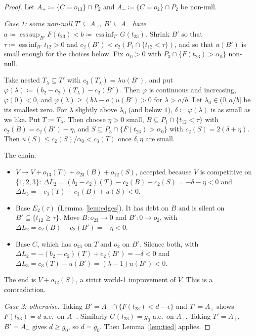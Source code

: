 \documentclass[11pt]{article}
\theoremstyle{definition}\newtheorem{definition}[theorem]{Definition}
\theoremstyle{remark}\newtheorem{remark}[theorem]{Remark}
\begin{document}
\begin{proof}
Let $A_+\coloneqq\{C=o_{13}\}\cap P_2$ and $A_-\coloneqq\{C=o_2\}\cap P_2$ be
non-null.

\emph{Case 1: some non-null $T'\subseteq A_+$, $B'\subseteq A_-$ have
$a\coloneqq\operatorname{ess\,sup}_{B'}F(t_{23})
<b\coloneqq\operatorname{ess\,inf}_{T'}G(t_{23})$.} Shrink $B'$ so that
$\tau\coloneqq\operatorname{ess\,inf}_{B'}t_{12}>0$ and
$c_2(B')<c_2(P_1\cap\{t_{12}<\tau\})$, and so that $u(B')$ is small enough
for the choices below. Fix $\alpha_0>0$ with $P_3\cap\{F(t_{23})>\alpha_0\}$
non-null.

Take nested $T_\lambda\subseteq T'$ with $c_3(T_\lambda)=\lambda u(B')$, and
put $\varphi(\lambda)\coloneqq(b_2-c_2)(T_\lambda)-c_2(B')$. Then $\varphi$ is
continuous and increasing, $\varphi(0)<0$, and
$\varphi(\lambda)\ge(b\lambda-a)u(B')>0$ for $\lambda>a/b$. Let
$\lambda_0\in(0,a/b]$ be its smallest zero. For $\lambda$ slightly above
$\lambda_0$ (and below $1$), $\delta\coloneqq\varphi(\lambda)$ is as small as
we like. Put $T\coloneqq T_\lambda$. Then choose $\eta>0$ small,
$B\subseteq P_1\cap\{t_{12}<\tau\}$ with $c_2(B)=c_2(B')-\eta$, and
$S\subseteq P_3\cap\{F(t_{23})>\alpha_0\}$ with $c_2(S)=2(\delta+\eta)$. Then
$u(S)\le c_2(S)/\alpha_0<c_3(T)$ once $\delta,\eta$ are small.

The chain:
\begin{itemize}[leftmargin=*,itemsep=2pt]
\item $V\to V+o_{13}(T)+o_{23}(B)+o_{12}(S)$, accepted because $V$ is
competitive on $\{1,2,3\}$:
$\Delta L_2=(b_2-c_2)(T)-c_2(B)-c_2(S)=-\delta-\eta<0$ and
$\Delta L_3=-c_3(T)-c_3(B)+u(S)<0$.
\item Base $E_2(\tau)$ (Lemma~\ref{lem:edges}). It has debt on $B$ and is
silent on $B'\subseteq\{t_{12}\ge\tau\}$. Move $B\colon o_{23}\to0$ and
$B'\colon0\to o_2$, with $\Delta L_2=c_2(B)-c_2(B')=-\eta<0$.
\item Base $C$, which has $o_{13}$ on $T$ and $o_2$ on $B'$. Silence both,
with $\Delta L_2=-(b_2-c_2)(T)+c_2(B')=-\delta<0$ and
$\Delta L_3=c_3(T)-u(B')=(\lambda-1)u(B')<0$.
\end{itemize}
The end is $V+o_{12}(S)$, a strict world-1 improvement of $V$. This is a
contradiction.

\emph{Case 2: otherwise.} Taking $B'=A_-\cap\{F(t_{23})<d-\epsilon\}$ and
$T'=A_+$ shows $F(t_{23})=d$ a.e.\ on $A_-$. Similarly $G(t_{23})=g_0$ a.e.\
on $A_+$. Taking $T'=A_+$, $B'=A_-$ gives $d\ge g_0$, so $d=g_0$. Then
Lemma~\ref{lem:tied} applies.
\end{proof}
\end{document}
